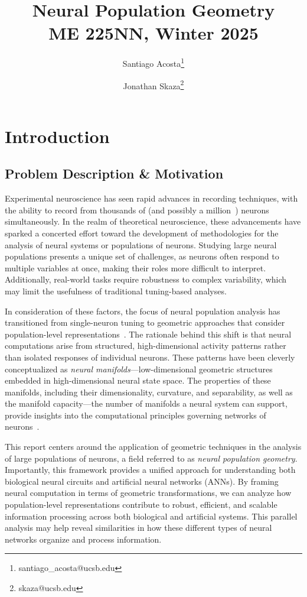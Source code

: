 \documentclass[11pt,a4paper]{article}
\author[1]{Santiago Acosta\thanks{santiago\_acosta@ucsb.edu}}
\author[1]{Jonathan Skaza\thanks{skaza@ucsb.edu}}
\affil[1]{Dynamical Neuroscience Graduate Program, University of California, Santa Barbara}
\title {Neural Population Geometry \\[1ex] \large ME 225NN, Winter 2025}
\date{}
\begin{document}
\maketitle
\section{Introduction}

\subsection{Problem Description \& Motivation}
Experimental neuroscience has seen rapid advances in recording techniques, with the ability to record from thousands of (and possibly a million~\cite{demas2021high}) neurons simultaneously. In the realm of theoretical neuroscience, these advancements have sparked a concerted effort toward the development of methodologies for the analysis of neural systems or populations of neurons. Studying large neural populations presents a unique set of challenges, as neurons often respond to multiple variables at once, making their roles more difficult to interpret. Additionally, real-world tasks require robustness to complex variability, which may limit the usefulness of traditional tuning-based analyses.

In consideration of these factors, the focus of neural population analysis has transitioned from single-neuron tuning to geometric approaches that consider population-level representations~\cite{yuste2015neuron, saxena2019towards}. The rationale behind this shift is that neural computations arise from structured, high-dimensional activity patterns rather than isolated responses of individual neurons. These patterns have been cleverly conceptualized as \textit{neural manifolds}---low-dimensional geometric structures embedded in high-dimensional neural state space. The properties of these manifolds, including their dimensionality, curvature, and separability, as well as the manifold capacity---the number of manifolds a neural system can support, provide insights into the computational principles governing networks of neurons~\cite{chung2021neural}.

This report centers around the application of geometric techniques in the analysis of large populations of neurons, a field referred to as \textit{neural population geometry}. Importantly, this framework provides a unified approach for understanding both biological neural circuits and artificial neural networks (ANNs). By framing neural computation in terms of geometric transformations, we can analyze how population-level representations contribute to robust, efficient, and scalable information processing across both biological and artificial systems. This parallel analysis may help reveal similarities in how these different types of neural networks organize and process information.
\end{document}
